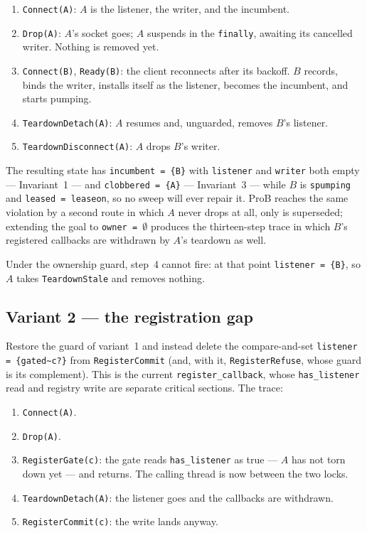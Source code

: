 \documentclass[a4paper,10pt,fleqn]{article}
\begin{document}
\begin{enumerate}
  \item \texttt{Connect(A)}: $A$ is the listener, the writer, and the
    incumbent.
  \item \texttt{Drop(A)}: $A$'s socket goes; $A$ suspends in the
    \texttt{finally}, awaiting its cancelled writer.  Nothing is
    removed yet.
  \item \texttt{Connect(B)}, \texttt{Ready(B)}: the client reconnects
    after its backoff.  $B$ records, binds the writer, installs itself
    as the listener, becomes the incumbent, and starts pumping.
  \item \texttt{TeardownDetach(A)}: $A$ resumes and, unguarded, removes
    $B$'s listener.
  \item \texttt{TeardownDisconnect(A)}: $A$ drops $B$'s writer.
\end{enumerate}

The resulting state has \texttt{incumbent = \{B\}} with
\texttt{listener} and \texttt{writer} both empty --- Invariant~1 ---
and \texttt{clobbered = \{A\}} --- Invariant~3 --- while $B$ is
\texttt{spumping} and \texttt{leased = leaseon}, so no sweep will ever
repair it.  ProB reaches the same violation by a second route in which
$A$ never drops at all, only is superseded; extending the goal to
\texttt{owner = $\emptyset$} produces the thirteen-step trace in which
$B$'s registered callbacks are withdrawn by $A$'s teardown as well.

Under the ownership guard, step~4 cannot fire: at that point
\texttt{listener = \{B\}}, so $A$ takes \texttt{TeardownStale} and
removes nothing.

\subsection*{Variant 2 --- the registration gap}

Restore the guard of variant~1 and instead delete the compare-and-set
\texttt{listener = \{gated\~{}c?\}} from \texttt{RegisterCommit} (and,
with it, \texttt{RegisterRefuse}, whose guard is its complement).  This
is the current \texttt{register\_callback}, whose \texttt{has\_listener}
read and registry write are separate critical sections.  The trace:

\begin{enumerate}
  \item \texttt{Connect(A)}.
  \item \texttt{Drop(A)}.
  \item \texttt{RegisterGate(c)}: the gate reads \texttt{has\_listener}
    as true --- $A$ has not torn down yet --- and returns.  The calling
    thread is now between the two locks.
  \item \texttt{TeardownDetach(A)}: the listener goes and the callbacks
    are withdrawn.
  \item \texttt{RegisterCommit(c)}: the write lands anyway.
\end{enumerate}
\end{document}
